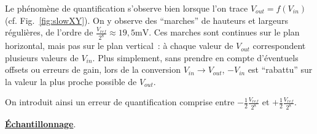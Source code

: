 \documentclass{article}
\begin{document}
Le phénomène de quantification s'observe bien lorsque l'on trace $V_{out}=f(V_{in})$ (cf. Fig.~\ref{fig:slowXY}). On y observe des ``marches'' de hauteurs et largeurs régulières, de l'ordre de $\frac{V_{ref}}{2^8}\approx\mathrm{19,5 mV}$. Ces marches sont continues sur le plan horizontal, mais pas sur le plan vertical~: à chaque valeur de $V_{out}$ correspondent plusieurs valeurs de $V_{in}$. Plus simplement, sans prendre en compte d'éventuels offsets ou erreurs de gain, lors de la conversion $V_{in}\rightarrow V_{out}$, $-V_{in}$ est ``rabattu'' sur la valeur la plus proche possible de $V_{out}$.

On introduit ainsi un erreur de quantification comprise entre $-\frac{1}{2}\frac{V_{ref}}{2^8}$ et $+\frac{1}{2}\frac{V_{ref}}{2^8}$.



\noindent \textbf{\underline{Échantillonnage}}.
\end{document}
